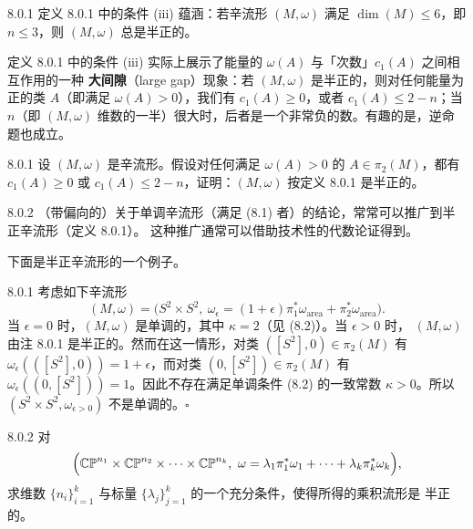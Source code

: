 \begin{wrem}{8.0.1}
  定义 8.0.1 中的条件 (iii) 蕴涵：若辛流形 $(M,\omega)$ 满足 $\dim(M)\leqslant6$，即
  $n\leqslant3$，则 $(M,\omega)$ 总是半正的。
\end{wrem}

定义 8.0.1 中的条件 (iii) 实际上展示了能量的 $\omega(A)$ 与「次数」$c_1(A)$ 之间相互作用的一种
\textbf{大间隙}（large gap）现象：若 $(M,\omega)$ 是半正的，则对任何能量为正的类 $A$（即满足
$\omega(A)>0$），我们有 $c_1(A)\geqslant0$，或者 $c_1(A)\leqslant2-n$；当 $n$（即 $(M,\omega)$
维数的一半）很大时，后者是一个非常负的数。有趣的是，逆命题也成立。

\begin{wexer}{8.0.1}
  设 $(M,\omega)$ 是辛流形。假设对任何满足 $\omega(A)>0$ 的 $A\in\pi_2(M)$，都有
  $c_1(A)\geqslant0$ 或 $c_1(A)\leqslant2-n$，证明：$(M,\omega)$ 按定义 8.0.1 是半正的。
\end{wexer}

\begin{wrem}{8.0.2}
  （带偏向的）关于单调辛流形（满足 (8.1) 者）的结论，常常可以推广到半正辛流形（定义 8.0.1）。
  这种推广通常可以借助技术性的代数论证得到。
\end{wrem}

下面是半正辛流形的一个例子。

\begin{wexam}{8.0.1}
  考虑如下辛流形
  \[
    (M,\omega)=\bigl(S^2\times S^2,\
      \omega_\epsilon=(1+\epsilon)\pi_1^*\omega_{\mathrm{area}}
        +\pi_2^*\omega_{\mathrm{area}}\bigr).
  \]
  当 $\epsilon=0$ 时，$(M,\omega)$ 是单调的，其中 $\kappa=2$（见 (8.2)）。当 $\epsilon>0$ 时，
  $(M,\omega)$ 由注 8.0.1 是半正的。然而在这一情形，对类 $([S^2],0)\in\pi_2(M)$ 有
  $\omega_\epsilon(([S^2],0))=1+\epsilon$，而对类 $(0,[S^2])\in\pi_2(M)$ 有
  $\omega_\epsilon((0,[S^2]))=1$。因此不存在满足单调条件 (8.2) 的一致常数 $\kappa>0$。所以
  $(S^2\times S^2,\omega_{\epsilon>0})$ 不是单调的。\hfill$\square$
\end{wexam}

\begin{wexer}{8.0.2}
  对
  \[
    \Bigl(\mathbb{CP}^{n_1}\times\mathbb{CP}^{n_2}\times\cdots\times\mathbb{CP}^{n_k},\
      \omega=\lambda_1\pi_1^*\omega_1+\cdots+\lambda_k\pi_k^*\omega_k\Bigr),
  \]
  求维数 $\{n_i\}_{i=1}^k$ 与标量 $\{\lambda_j\}_{j=1}^k$ 的一个充分条件，使得所得的乘积流形是
  半正的。
\end{wexer}

